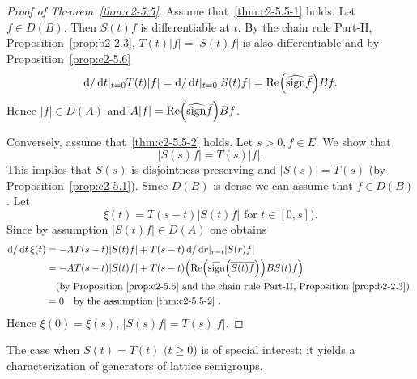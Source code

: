 \begin{proof}[Proof of Theorem~\ref{thm:c2-5.5}]
Assume that~\ref{thm:c2-5.5-1}   holds. 
Let $f \in D(B)$. 
Then $S(t)f$ is differentiable at $t$. 
By the chain rule Part-II, Proposition~\ref{prop:b2-2.3},
$T(t)|f| = |S(t)f|$ is also differentiable and by  Proposition~\ref{prop:c2-5.6}
\[
\diff{}/\dt|_{t=0} T(t)|f| = \diff{}/\dt|_{t=0} |S(t)f| = \Re\mleft(\widehat{\sign}  \bar{f}\mright)Bf .
\]
Hence $|f| \in D(A)$ and $A|f| = \Re\mleft(\widehat{\sign}  \bar{f}\mright)Bf$.

Conversely, assume that~\ref{thm:c2-5.5-2}   holds. 
Let $s > 0, f \in E$. 
We show that 
\[
|S(s)f| = T(s)|f| .
\]
This implies that $S(s)$ is disjointness preserving and $|S(s)| = T(s)$ (by Proposition~\ref{prop:c2-5.1}). 
Since $D(B)$ is dense we can assume that $f \in D(B)$. 
Let 
\[
\xi(t) = T(s-t)|S(t)f|  \text{ for } t \in [0,s]) .
\]
Since by assumption $|S(t)f| \in D(A)$ one obtains
\begin{align*}
\diff{}/\dt \, \xi(t) &= -AT(s-t)|S(t)f| + T(s-t)\diff{}/\dr|_{r=t} |S(r)f|\\
&= -AT(s-t)|S(t)f| + T(s-t)\mleft(\Re\mleft(\widehat{\sign}  \mleft(\overline{S(t)f}\mright)\mright)BS(t)f\mright)\\
&\quad \text{(by  Proposition~\ref{prop:c2-5.6}   and the chain rule Part-II, Proposition~\ref{prop:b2-2.3})
}\\
&= 0 \quad \text{by the assumption~\ref{thm:c2-5.5-2}  }.
\end{align*}
Hence $\xi(0) = \xi(s)$, \ie $|S(s)f| = T(s)|f|$.
\end{proof}
The case when $S(t) = T(t)$ $(t \geq 0$) is of special interest: it yields a characterization of generators of lattice semigroups.

